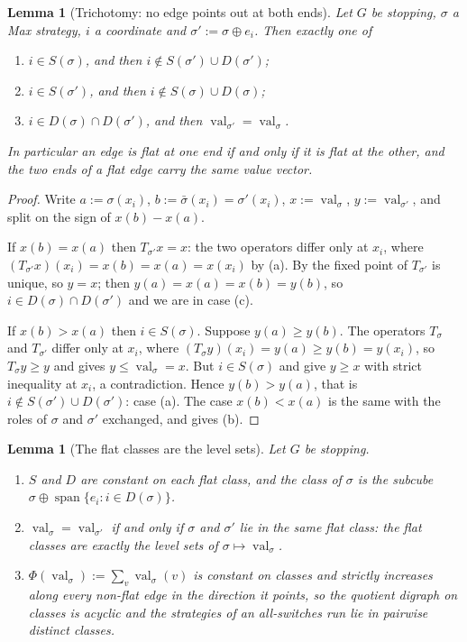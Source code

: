 \documentclass[11pt]{article}
\theoremstyle{plain}
\newtheorem{lemma}[theorem]{Lemma}
\theoremstyle{definition}
\DeclareMathOperator{\val}{val}
\begin{document}
\begin{lemma}[Trichotomy: no edge points out at both ends]\label{lem:trichotomy}
Let $G$ be stopping, $\sigma$ a Max strategy, $i$ a coordinate and
$\sigma':=\sigma\oplus e_i$. Then exactly one of
\begin{enumerate}[label=(\alph*),leftmargin=2.2em]
\item $i\in S(\sigma)$, and then $i\notin S(\sigma')\cup D(\sigma')$;
\item $i\in S(\sigma')$, and then $i\notin S(\sigma)\cup D(\sigma)$;
\item $i\in D(\sigma)\cap D(\sigma')$, and then $\val_{\sigma'}=\val_\sigma$.
\end{enumerate}
In particular an edge is flat at one end if and only if it is flat at the
other, and the two ends of a flat edge carry the same value vector.
\end{lemma}

\begin{proof}
Write $a:=\sigma(x_i)$, $b:=\bar\sigma(x_i)=\sigma'(x_i)$, $x:=\val_\sigma$,
$y:=\val_{\sigma'}$, and split on the sign of $x(b)-x(a)$.

If $x(b)=x(a)$ then $T_{\sigma'}x=x$: the two operators differ only at $x_i$,
where $(T_{\sigma'}x)(x_i)=x(b)=x(a)=x(x_i)$ by (a).
By  the fixed point of $T_{\sigma'}$ is unique, so
$y=x$; then $y(a)=x(a)=x(b)=y(b)$, so $i\in D(\sigma)\cap D(\sigma')$ and we
are in case (c).

If $x(b)>x(a)$ then $i\in S(\sigma)$. Suppose $y(a)\ge y(b)$. The operators
$T_\sigma$ and $T_{\sigma'}$ differ only at $x_i$, where
$(T_\sigma y)(x_i)=y(a)\ge y(b)=y(x_i)$, so $T_\sigma y\ge y$ and
 gives $y\le\val_\sigma=x$. But $i\in S(\sigma)$ and
 give $y\ge x$ with strict inequality at $x_i$, a
contradiction. Hence $y(b)>y(a)$, that is $i\notin S(\sigma')\cup D(\sigma')$:
case (a). The case $x(b)<x(a)$ is the same with the roles of $\sigma$ and
$\sigma'$ exchanged, and gives (b).
\end{proof}

\begin{lemma}[The flat classes are the level sets]\label{lem:flat-class}
Let $G$ be stopping.
\begin{enumerate}[label=(\alph*),leftmargin=2.2em]
\item $S$ and $D$ are constant on each flat class, and the class of $\sigma$
      is the subcube $\sigma\oplus\operatorname{span}\{e_i:i\in D(\sigma)\}$.
\item $\val_\sigma=\val_{\sigma'}$ if and only if $\sigma$ and $\sigma'$ lie
      in the same flat class: the flat classes are exactly the level sets of
      $\sigma\mapsto\val_\sigma$.
\item $\Phi(\val_\sigma):=\sum_v\val_\sigma(v)$ is constant on classes and
      strictly increases along every non-flat edge in the direction it
      points, so the quotient digraph on classes is acyclic and the
      strategies of an all-switches run lie in pairwise distinct classes.
\end{enumerate}
\end{lemma}
\end{document}
